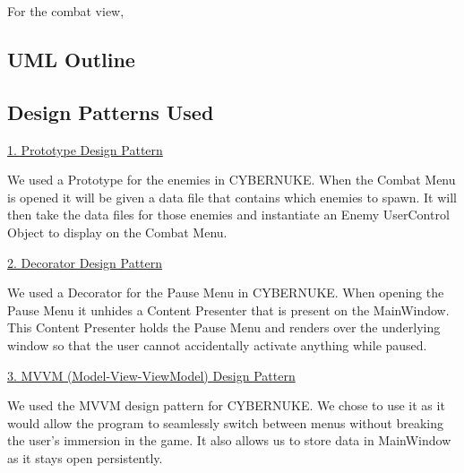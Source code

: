 \documentclass[10pt,conference,onecolumn,compsoc]{IEEEtran}
\begin{document}
For the combat view, 



\subsection{UML Outline}



\subsection{Design Patterns Used}
\underline{1. Prototype Design Pattern}
\vspace{5px}

We used a Prototype for the enemies in CYBERNUKE. When the Combat Menu is opened it will be given a data file that contains which enemies to spawn. It will then take the data files for those enemies and instantiate an Enemy UserControl Object to display on the Combat Menu.

\underline{2. Decorator Design Pattern}
\vspace{5px}

We used a Decorator for the Pause Menu in CYBERNUKE. When opening the Pause Menu it unhides a Content Presenter that is present on the MainWindow. This Content Presenter holds the Pause Menu and renders over the underlying window so that the user cannot accidentally activate anything while paused.

\underline{3. MVVM (Model-View-ViewModel) Design Pattern}
\vspace{5px}

We used the MVVM design pattern for CYBERNUKE. We chose to use it as it would allow the program to seamlessly switch between menus without breaking the user's immersion in the game. It also allows us to store data in MainWindow as it stays open persistently.
\end{document}
